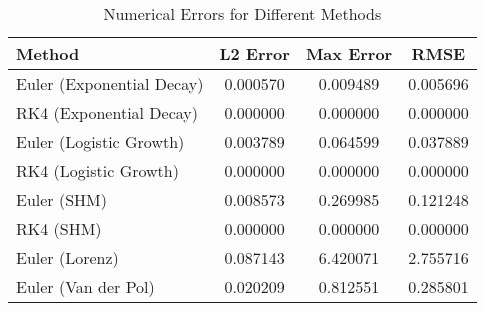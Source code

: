 \begin{table}[h]
    \centering
    \begin{tabular}{|l|c|c|c|} \hline
    Method & L2 Error & Max Error & RMSE \\ \hline
    Euler (Exponential Decay) & 0.000570 & 0.009489 & 0.005696 \\ \hline
    RK4 (Exponential Decay) & 0.000000 & 0.000000 & 0.000000 \\ \hline
    Euler (Logistic Growth) & 0.003789 & 0.064599 & 0.037889 \\ \hline
    RK4 (Logistic Growth) & 0.000000 & 0.000000 & 0.000000 \\ \hline
    Euler (SHM) & 0.008573 & 0.269985 & 0.121248 \\ \hline
    RK4 (SHM) & 0.000000 & 0.000000 & 0.000000 \\ \hline
    Euler (Lorenz) & 0.087143 & 6.420071 & 2.755716 \\ \hline
    Euler (Van der Pol) & 0.020209 & 0.812551 & 0.285801 \\ \hline
    \end{tabular}
    \caption{Numerical Errors for Different Methods}
    \label{tab:errors}
\end{table}
